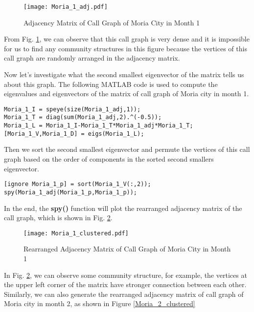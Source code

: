 \begin{figure}[!t]
\centering
\texttt{[image: Moria\_1\_adj.pdf]}
\caption{Adjacency Matrix of Call Graph of Moria City in Month 1}
\label{Moria_1_adj}
\end{figure}  

From Fig. \ref{Moria_1_adj}, we can observe that this call graph is very dense and it is impossible for us to find any community structures in this figure because the vertices of this call graph are randomly arranged in the adjacency matrix. 

Now let's investigate what the second smallest eigenvector of the  matrix tells us about this graph. The following MATLAB code is used to compute the eigenvalues and eigenvectors of the  matrix of call graph of Moria city in month 1.

\begin{lstlisting}
Moria_1_I = speye(size(Moria_1_adj,1));
Moria_1_T = diag(sum(Moria_1_adj,2).^(-0.5));
Moria_1_L = Moria_1_I-Moria_1_T*Moria_1_adj*Moria_1_T;
[Moria_1_V,Moria_1_D] = eigs(Moria_1_L);
\end{lstlisting}

Then we sort the second smallest eigenvector and permute the vertices of this call graph based on the order of components in the sorted second smallers eigenvector.  

\begin{lstlisting}
[ignore Moria_1_p] = sort(Moria_1_V(:,2));
spy(Moria_1_adj(Moria_1_p,Moria_1_p));
\end{lstlisting} 

In the end, the \textbf{spy()} function will plot the rearranged adjacency matrix of the call graph, which is shown in Fig. \ref{Moria_1_clustered}. 

\begin{figure}[!t]
\centering
\texttt{[image: Moria\_1\_clustered.pdf]}
\caption{Rearranged Adjacency Matrix of Call Graph of Moria City in Month 1}
\label{Moria_1_clustered}
\end{figure} 

In Fig. \ref{Moria_1_clustered}, we can observe some community structure, for example, the vertices at the upper left corner of the matrix have stronger connection between each other. Similarly, we can also generate the rearranged adjacency matrix of call graph of Moria city in month 2, as shown in Figure \ref{Moria_2_clustered} 

